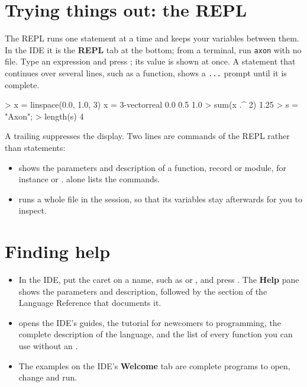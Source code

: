 \documentclass[11pt,a4paper,openany]{report}
\begin{document}
\section{Trying things out: the REPL}

The REPL runs one statement at a time and keeps your variables between them.
In the IDE it is the \textbf{REPL} tab at the bottom; from a terminal, run
\texttt{axon} with no file. Type an expression and press ; its value
is shown at once. A statement that continues over several lines, such as a
function, shows a \texttt{...} prompt until it is complete.

\begin{axonrepl}
> x = linspace(0.0, 1.0, 3)
x = 3-vector{real}
  0.0
  0.5
  1.0
> sum(x .^ 2)
1.25
> s = "Axon";
> length(s)
4
\end{axonrepl}

A trailing \code{;} suppresses the display. Two lines are commands of the REPL
rather than statements:

\begin{itemize}
\item {} shows the parameters and description of a function,
  record or module, for instance  or .
   alone lists the commands.
\item {} runs a whole file in the session, so that its
  variables stay afterwards for you to inspect.
\end{itemize}

\section{Finding help}

\begin{itemize}
\item In the IDE, put the caret on a name, such as  or
  , and press . The \textbf{Help} pane shows the
  parameters and description, followed by the section of the Language Reference
  that documents it.
\item {} opens the IDE's guides, 
  the tutorial for newcomers to programming,  the complete description of the language, and  the list of every function you can use without an
  .
\item The examples on the IDE's \textbf{Welcome} tab are complete programs to
  open, change and run.
\end{itemize}
\end{document}
